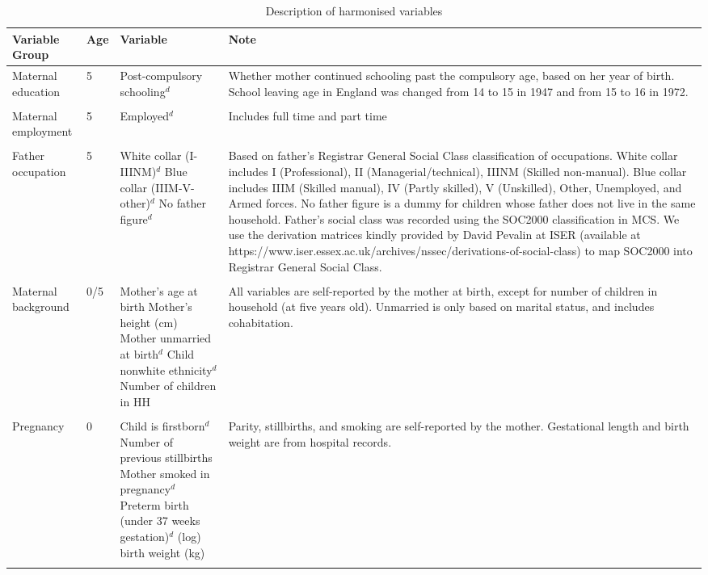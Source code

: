 
\begin{sidewaystable}[ht!]
\caption{Description of harmonised variables}\label{tab:harmvar}
\centering{} \scriptsize
\begin{tabular}{L{.15\textwidth}C{.08\textwidth}L{.22\textwidth}L{.55\textwidth}}
\toprule
Variable Group & Age & Variable & Note \\
\midrule
Maternal education & 5 & Post-compulsory schooling$^d$ & Whether mother continued schooling past the compulsory age, based on her year of birth. School leaving age in England was changed from 14 to 15 in 1947 and from 15 to 16 in 1972. \\ \\[-1.5em]
Maternal employment & 5 & Employed$^d$ & Includes full time and part time \\ \\[-1.5em]
Father occupation & 5 & White collar (I-IIINM)$^d$ \newline Blue collar (IIIM-V-other)$^d$ \newline No father figure$^d$ & Based on father's Registrar General Social Class classification of occupations. White collar includes I (Professional), II (Managerial/technical), IIINM (Skilled non-manual). Blue collar includes IIIM (Skilled manual), IV (Partly skilled), V (Unskilled), Other, Unemployed, and Armed forces. No father figure is a dummy for children whose father does not live in the same household. Father's social class was recorded using the SOC2000 classification in MCS. We use the derivation matrices kindly provided by David Pevalin at ISER (available at https://www.iser.essex.ac.uk/archives/nssec/derivations-of-social-class) to map SOC2000 into Registrar General Social Class. \\ \\[-1.5em]
Maternal background & 0/5 & Mother's age at birth \newline Mother's height (cm) \newline Mother unmarried at birth$^d$ \newline Child nonwhite ethnicity$^d$  \newline Number of children in HH & All variables are self-reported by the mother at birth, except for number of children in household (at five years old). Unmarried is only based on marital status, and includes cohabitation. \\ \\[-1.5em]
Pregnancy & 0 & Child is firstborn$^d$ \newline Number of previous stillbirths \newline Mother smoked in pregnancy$^d$ \newline Preterm birth (under 37 weeks gestation)$^d$ \newline (log) birth weight (kg) & Parity, stillbirths, and smoking are self-reported by the mother. Gestational length and birth weight are from hospital records. \\ \\[-1.5em]

\end{tabular}
\end{sidewaystable}

